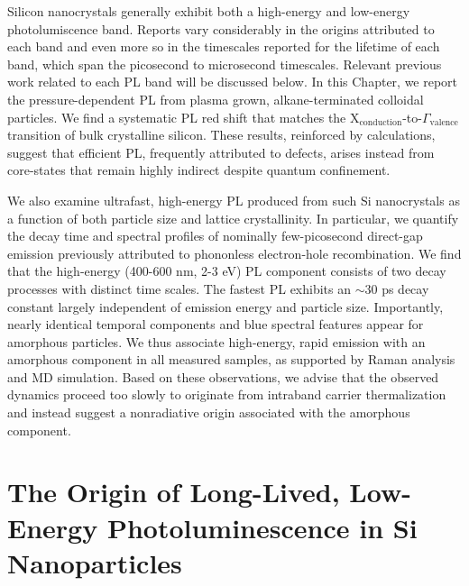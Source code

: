 Silicon nanocrystals generally exhibit both a high-energy and low-energy photolumiscence band. Reports vary considerably in the origins attributed to each band and even more so in the timescales reported for the lifetime of each band, which span the picosecond to microsecond timescales. Relevant previous work related to each PL band will be discussed below. In this Chapter, we report the pressure-dependent PL from plasma grown, alkane-terminated colloidal particles. We find a systematic PL red shift that matches the X$_{\mathrm{conduction}}$-to-$\Gamma_{\mathrm{valence}}$ transition of bulk crystalline silicon. These results, reinforced by calculations, suggest that efficient PL, frequently attributed to defects, arises instead from core-states that remain highly indirect despite quantum confinement. \par

We also examine ultrafast, high-energy PL produced from such Si nanocrystals as a function of both particle size and lattice crystallinity. In particular, we quantify the decay time and spectral profiles of nominally few-picosecond direct-gap emission previously attributed to phononless electron-hole recombination. We find that the high-energy (400-600 nm, 2-3 eV) PL component consists of two decay processes with distinct time scales. The fastest PL exhibits an $\sim$30 ps decay constant largely independent of emission energy and particle size. Importantly, nearly identical temporal components and blue spectral features appear for amorphous particles. We thus associate high-energy, rapid emission with an amorphous component in all measured samples, as supported by Raman analysis and MD simulation. Based on these observations, we advise that the observed dynamics proceed too slowly to originate from intraband carrier thermalization and instead suggest a nonradiative origin associated with the amorphous component.

\section{The Origin of Long-Lived, Low-Energy Photoluminescence in Si Nanoparticles}

